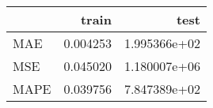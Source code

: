 \begin{tabular}{lrr}
\toprule
{} &     train &          test \\
\midrule
MAE  &  0.004253 &  1.995366e+02 \\
MSE  &  0.045020 &  1.180007e+06 \\
MAPE &  0.039756 &  7.847389e+02 \\
\bottomrule
\end{tabular}
